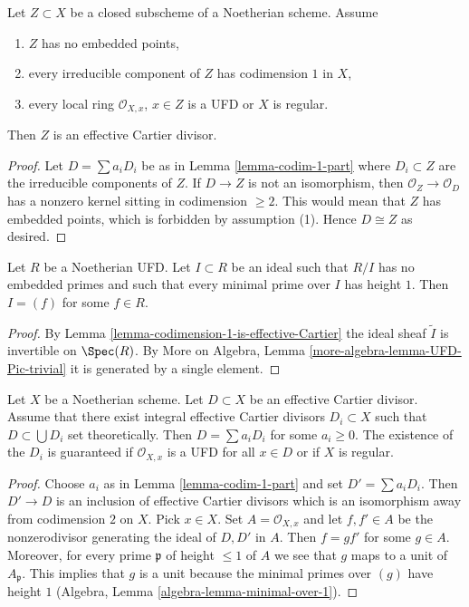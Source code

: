 \begin{lemma}
\label{lemma-codimension-1-is-effective-Cartier}
Let $Z \subset X$ be a closed subscheme of a Noetherian scheme. Assume
\begin{enumerate}
\item $Z$ has no embedded points,
\item every irreducible component of $Z$ has codimension $1$ in $X$,
\item every local ring $\mathcal{O}_{X, x}$, $x \in Z$ is
a UFD or $X$ is regular.
\end{enumerate}
Then $Z$ is an effective Cartier divisor.
\end{lemma}

\begin{proof}
Let $D = \sum a_i D_i$ be as in Lemma \ref{lemma-codim-1-part}
where $D_i \subset Z$ are the irreducible components of $Z$.
If $D \to Z$ is not an isomorphism, then $\mathcal{O}_Z \to \mathcal{O}_D$
has a nonzero kernel sitting in codimension $\geq 2$. This
would mean that $Z$ has embedded points, which is forbidden
by assumption (1). Hence $D \cong Z$ as desired.
\end{proof}

\begin{lemma}
\label{lemma-UFD-one-equation-CM}
Let $R$ be a Noetherian UFD. Let $I \subset R$ be an ideal
such that $R/I$ has no embedded primes and such that
every minimal prime over $I$ has height $1$.
Then $I = (f)$ for some $f \in R$.
\end{lemma}

\begin{proof}
By Lemma \ref{lemma-codimension-1-is-effective-Cartier}
the ideal sheaf $\tilde I$ is invertible on $\Spec(R)$.
By More on Algebra, Lemma \ref{more-algebra-lemma-UFD-Pic-trivial}
it is generated by a single element.
\end{proof}

\begin{lemma}
\label{lemma-effective-Cartier-divisor-is-a-sum}
Let $X$ be a Noetherian scheme. Let $D \subset X$ be an effective
Cartier divisor. Assume that there exist integral effective Cartier
divisors $D_i \subset X$ such that $D \subset \bigcup D_i$
set theoretically. Then $D = \sum a_i D_i$ for some $a_i \geq 0$.
The existence of the $D_i$ is guaranteed if $\mathcal{O}_{X, x}$
is a UFD for all $x \in D$ or if $X$ is regular.
\end{lemma}

\begin{proof}
Choose $a_i$ as in Lemma \ref{lemma-codim-1-part} and set $D' = \sum a_i D_i$.
Then $D' \to D$ is an inclusion of effective Cartier divisors which
is an isomorphism away from codimension $2$ on $X$. Pick $x \in X$.
Set $A = \mathcal{O}_{X, x}$ and let $f, f' \in A$ be the nonzerodivisor
generating the ideal of $D, D'$ in $A$. Then $f = gf'$ for some $g \in A$.
Moreover, for every prime $\mathfrak p$ of height $\leq 1$ of $A$ we see
that $g$ maps to a unit of $A_\mathfrak p$. This implies that $g$ is
a unit because the minimal primes over $(g)$ have height $1$
(Algebra, Lemma \ref{algebra-lemma-minimal-over-1}).
\end{proof}

